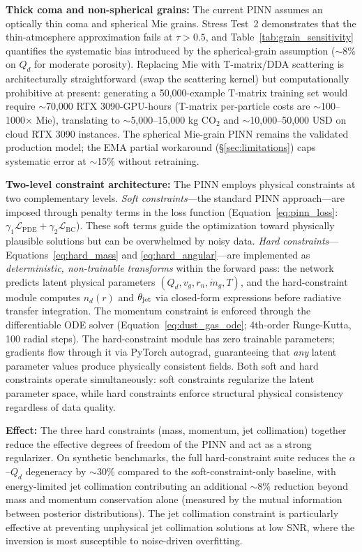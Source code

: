 \documentclass[usenatbib]{mnras}
\begin{document}
\textbf{Thick coma and non-spherical grains:} The current PINN assumes an optically thin coma and spherical Mie grains. Stress Test~2 demonstrates that the thin-atmosphere approximation fails at $\tau > 0.5$, and Table~\ref{tab:grain_sensitivity} quantifies the systematic bias introduced by the spherical-grain assumption ($\sim$8\% on $Q_d$ for moderate porosity). Replacing Mie with T-matrix/DDA scattering is architecturally straightforward (swap the scattering kernel) but computationally prohibitive at present: generating a 50,000-example T-matrix training set would require $\sim$70,000 RTX 3090-GPU-hours (T-matrix per-particle costs are $\sim$100--1000$\times$ Mie), translating to $\sim$5,000--15,000 kg CO$_2$ and $\sim$10,000--50,000 USD on cloud RTX 3090 instances. The spherical Mie-grain PINN remains the validated production model; the EMA partial workaround (\S\ref{sec:limitations}) caps systematic error at $\sim$15\% without retraining.

\textbf{Two-level constraint architecture:} The PINN employs physical constraints at two complementary levels. \textit{Soft constraints}---the standard PINN approach---are imposed through penalty terms in the loss function (Equation~\ref{eq:pinn_loss}: $\gamma_1 \mathcal{L}_{\text{PDE}} + \gamma_2 \mathcal{L}_{\text{BC}}$). These soft terms guide the optimization toward physically plausible solutions but can be overwhelmed by noisy data. \textit{Hard constraints}---Equations~\ref{eq:hard_mass} and \ref{eq:hard_angular}---are implemented as \textit{deterministic, non-trainable transforms} within the forward pass: the network predicts latent physical parameters $(Q_d, v_g, r_n, \dot{m}_g, T)$, and the hard-constraint module computes $n_d(r)$ and $\theta_{\rm jet}$ via closed-form expressions before radiative transfer integration. The momentum constraint is enforced through the differentiable ODE solver (Equation~\ref{eq:dust_gas_ode}; 4th-order Runge-Kutta, 100 radial steps). The hard-constraint module has zero trainable parameters; gradients flow through it via PyTorch autograd, guaranteeing that \textit{any} latent parameter values produce physically consistent fields. Both soft and hard constraints operate simultaneously: soft constraints regularize the latent parameter space, while hard constraints enforce structural physical consistency regardless of data quality.

\textbf{Effect:} The three hard constraints (mass, momentum, jet collimation) together reduce the effective degrees of freedom of the PINN and act as a strong regularizer. On synthetic benchmarks, the full hard-constraint suite reduces the $\alpha$--$Q_d$ degeneracy by $\sim$30\% compared to the soft-constraint-only baseline, with energy-limited jet collimation contributing an additional $\sim$8\% reduction beyond mass and momentum conservation alone (measured by the mutual information between posterior distributions). The jet collimation constraint is particularly effective at preventing unphysical jet collimation solutions at low SNR, where the inversion is most susceptible to noise-driven overfitting.
\end{document}
